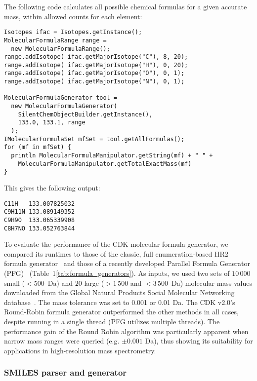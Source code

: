 \documentclass[doublespacing]{bmcart}
\def \cdkversion {v2.0}
\begin{document}
The following code calculates all possible chemical formulas for a given
accurate mass, within allowed counts for each element:

\vspace{0.2cm}
\begin{verbatim}
Isotopes ifac = Isotopes.getInstance();
MolecularFormulaRange range =
  new MolecularFormulaRange();
range.addIsotope( ifac.getMajorIsotope("C"), 8, 20);
range.addIsotope( ifac.getMajorIsotope("H"), 0, 20);
range.addIsotope( ifac.getMajorIsotope("O"), 0, 1);
range.addIsotope( ifac.getMajorIsotope("N"), 0, 1);

MolecularFormulaGenerator tool =
  new MolecularFormulaGenerator(
    SilentChemObjectBuilder.getInstance(),
    133.0, 133.1, range
  );
IMolecularFormulaSet mfSet = tool.getAllFormulas();
for (mf in mfSet) {
  println MolecularFormulaManipulator.getString(mf) + " " +
    MolecularFormulaManipulator.getTotalExactMass(mf)
}
\end{verbatim}
\vspace{0.2cm}

This gives the following output:

\vspace{0.2cm}
\begin{verbatim}
C11H   133.007825032
C9H11N 133.089149352
C9H9O  133.065339908
C8H7NO 133.052763844
\end{verbatim}
\vspace{0.2cm}

 To evaluate the performance of the CDK molecular formula generator, we
compared its runtimes to those of the classic, full enumeration-based HR2
formula generator~\cite{Kind2007} and those of a recently developed Parallel
Formula Generator (PFG)~\cite{Zhang2016} (Table~1\ref{tab:formula_generators}).
As inputs, we used two sets of $10\,000$ small ($< 500$~Da) and $20$ large ($>
1\,500$ and $< 3\,500$~Da) molecular mass values downloaded from the Global
Natural Products Social Molecular Networking database~\cite{wang2016}. The mass
tolerance was set to 0.001 or 0.01 Da. The CDK \cdkversion{}'s Round-Robin 
formula generator outperformed the other methods in all cases, despite running
in a single thread (PFG utilizes multiple threads). The performance gain of
the Round Robin algorithm was particularly apparent when narrow mass ranges 
were queried (e.g. $\pm 0.001$ Da), thus showing its suitability for
applications in high-resolution mass spectrometry.

\subsubsection*{SMILES parser and generator}
\end{document}

